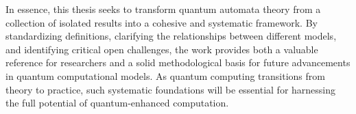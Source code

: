 In essence, this thesis seeks to transform quantum automata theory from a collection of isolated results into a cohesive and systematic framework. By standardizing definitions, clarifying the relationships between different models, and identifying critical open challenges, the work provides both a valuable reference for researchers and a solid methodological basis for future advancements in quantum computational models. As quantum computing transitions from theory to practice, such systematic foundations will be essential for harnessing the full potential of quantum-enhanced computation.
